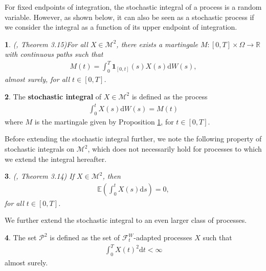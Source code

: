 \documentclass[english]{article}
\numberwithin{equation}{section}
\numberwithin{figure}{section}
\theoremstyle{bolddescit}
\newtheorem{theorem}{\protect\theoremname}[section]
\theoremstyle{definition}
\newtheorem{definition}[theorem]{\protect\definitionname}
\theoremstyle{definition}
\theoremstyle{plain}
\theoremstyle{plain}
\theoremstyle{bolddesc}
\theoremstyle{plain}
\newtheorem{proposition}[theorem]{\protect\propositionname}
\theoremstyle{remark}
\providecommand{\definitionname}{Definition}
\providecommand{\propositionname}{Proposition}
\providecommand{\theoremname}{Theorem}
\begin{document}
For fixed endpoints of integration, the stochastic integral of a process is a random variable. However, as shown below, it can also be seen as a stochastic process if we consider the integral as a function of its upper endpoint of integration.

\begin{proposition}(\cite{capinski_stochastic_2012}, Theorem 3.15)\label{prop:stochastic-integral-martingale}
  For all $X \in \mathcal{M}^2$, there exists a martingale $M : [0,T] \times \Omega \to \mathbb{R}$ with continuous paths such that
  \begin{align*}
    M(t) = \int_0^T \mathbf{1}_{[0,t]}(s) X(s) \mathrm{d}W(s),
  \end{align*}
  almost surely, for all $t \in [0,T]$.
\end{proposition}

\begin{definition}\label{def:stochastic-integral-as-process}
  The \textbf{stochastic integral} of $X \in \mathcal{M}^2$ is defined as the process
  \begin{align}\label{eq:stochastic-integral-process}
    \int_0^t X(s) \mathrm{d}W(s) = M(t)
  \end{align}
  where $M$ is the martingale given by Proposition \ref{prop:stochastic-integral-martingale}, for $t \in [0,T]$.
\end{definition}

Before extending the stochastic integral further, we note the following property of stochastic integrals on $\mathcal{M}^2$, which does not necessarily hold for processes to which we extend the integral hereafter.

\begin{theorem}\label{thm:stochastic-integral-expectation-m2}
  (\cite{capinski_stochastic_2012}, Theorem 3.14)
  If $X \in \mathcal{M}^2$, then
  \begin{align*}
    \mathbb{E}\left(\int_0^t X(s) \mathrm{d}s\right) = 0,
  \end{align*}
  for all $t \in [0,T]$.
\end{theorem}

We further extend the stochastic integral to an even larger class of processes.

\begin{definition}
  The set $\mathcal{P}^2$ is defined as the set of $\mathcal{F}^W_t$-adapted processes $X$ such that
  \begin{align*}
    \int_0^T X(t)^2 \mathrm{d}t < \infty
  \end{align*}
  almost surely.
\end{definition}
\end{document}
